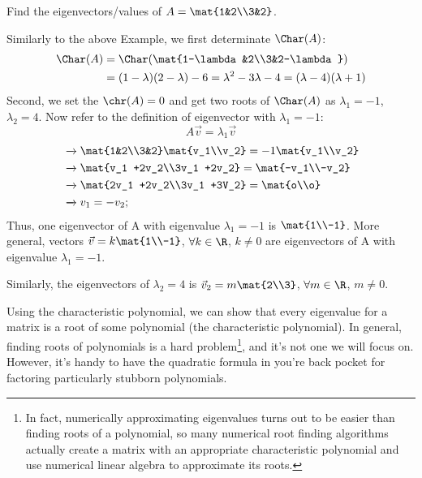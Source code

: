 \begin{example}
	Find the eigenvectors/values of $A=\mat{1&2\\3&2}$.

	Similarly to the above Example, we first determinate $\Char(A)$:
	\begin{align*}
	    \Char(A)&=\Char(\mat{1-\lambda&2\\3&2-\lambda})\\
	            &=(1-\lambda)(2-\lambda)-6=\lambda^2-3\lambda-4=(\lambda-4)(\lambda+1)
	\end{align*}
	Second, we set the $\chr(A)=0$ and get two roots of $\Char(A)$ as $\lambda_1=-1$, $\lambda_2=4$. Now refer to the definition of eigenvector with $\lambda_1=-1$:
	$$A\vec v=\lambda_1 \vec v$$
	\begin{align*}
	   &\xrightarrow{} \mat{1&2\\3&2}\mat{v_1\\v_2}=-1\mat{v_1\\v_2}\\
	   &\xrightarrow{} \mat{v_1 +2v_2\\3v_1 +2v_2}=\mat{-v_1\\-v_2}\\
	   &\xrightarrow{} \mat{2v_1 +2v_2\\3v_1 +3V_2}= \mat{o\\o}\\
	   &\xrightarrow{} v_1=-v_2;
	\end{align*}
	Thus, one eigenvector of A with eigenvalue $\lambda_1=-1$ is $\mat{1\\-1}$. More general, vectors $\vec v = k \mat{1\\-1}$, $\forall k \in \R$, $k \neq 0$ are eigenvectors of A with eigenvalue $\lambda_1=-1$. 
	
	Similarly, the eigenvectors of $\lambda_2=4$ is $\vec v_2 = m\mat{2\\3}$, $\forall m \in \R$, $m \neq 0$.
	
\end{example}

Using the characteristic polynomial, we can show that every eigenvalue
for a matrix is a root of some polynomial (the characteristic polynomial).
In general, finding roots of polynomials is a hard problem\footnote{ In fact,
numerically approximating eigenvalues turns out to be easier than finding roots
of a polynomial, so many numerical root finding algorithms actually create a matrix
with an appropriate characteristic polynomial and use numerical linear
algebra to approximate its roots.}, and it's not one we will focus on. However, it's
handy to have the quadratic formula in you're back pocket for factoring particularly
stubborn polynomials.

